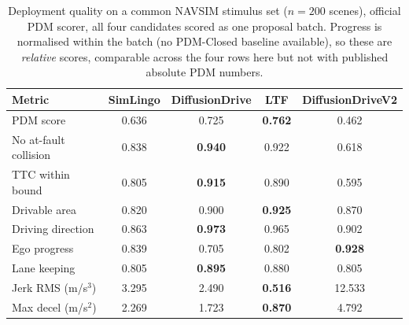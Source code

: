 \begin{table}[!tb]
\centering
\footnotesize
\setlength{\tabcolsep}{4pt}
\caption{Deployment quality on a common NAVSIM stimulus set ($n=200$ scenes), official PDM scorer, all four candidates scored as one proposal batch. Progress is normalised within the batch (no PDM-Closed baseline available), so these are \emph{relative} scores, comparable across the four rows here but not with published absolute PDM numbers.}
\label{tab:deploy}
\begin{tabular}{lcccc}
\toprule
Metric & SimLingo & DiffusionDrive & LTF & DiffusionDriveV2\\
\midrule
PDM score & 0.636 & 0.725 & \textbf{0.762} & 0.462\\
No at-fault collision & 0.838 & \textbf{0.940} & 0.922 & 0.618\\
TTC within bound & 0.805 & \textbf{0.915} & 0.890 & 0.595\\
Drivable area & 0.820 & 0.900 & \textbf{0.925} & 0.870\\
Driving direction & 0.863 & \textbf{0.973} & 0.965 & 0.902\\
Ego progress & 0.839 & 0.705 & 0.802 & \textbf{0.928}\\
Lane keeping & 0.805 & \textbf{0.895} & 0.880 & 0.805\\
Jerk RMS (m/s$^3$) & 3.295 & 2.490 & \textbf{0.516} & 12.533\\
Max decel (m/s$^2$) & 2.269 & 1.723 & \textbf{0.870} & 4.792\\
\bottomrule
\end{tabular}
\end{table}
